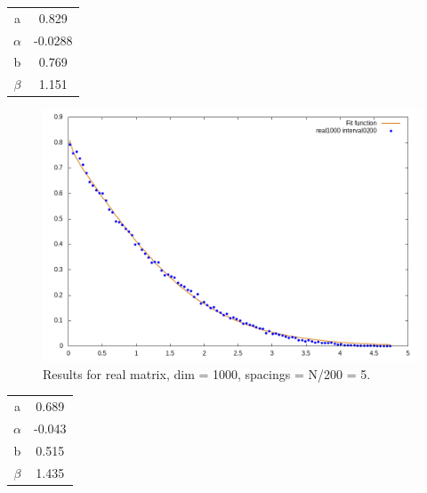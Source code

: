\documentclass[12pt, a4paper, notitlepage]{report}
\begin{document}
\begin{table}[H]
	\centering
	\begin{tabular}{|c|c|}
		
		\hline

		a			& 0.829	\\
		$\alpha$	& -0.0288	\\
		b			& 0.769	\\
		$\beta$		& 1.151	\\
		
		\hline
		
	\end{tabular}
\end{table}

\newpage

\begin{figure}[H]
	\centering
	\includegraphics[scale=0.6]{./Real_1000/hist_interval_0005_fit.png} 
	\caption{Results for real matrix, dim = 1000, spacings = N/200 = 5.}
	\label{figure_lambdas}
\end{figure}

\begin{table}[H]
	\centering
	\begin{tabular}{|c|c|}
		
		\hline
		a			& 0.689	\\
		$\alpha$	& -0.043	\\
		b			& 0.515	\\
		$\beta$		& 1.435	\\
		
		\hline
		
	\end{tabular}
\end{table}

\vspace{2cm}
\end{document}
